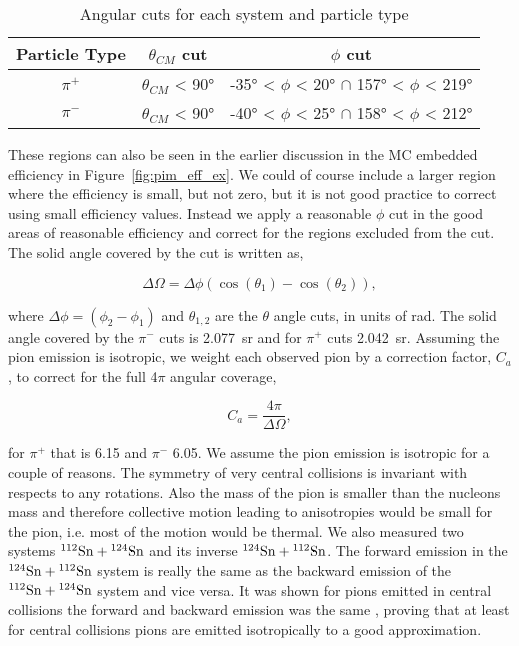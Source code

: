  \begin{table*}[!htb]
 \centering
{}
\begin{tabular}{@{}ccc@{}}\toprule 
Particle Type & $\theta_{CM}$ cut & $\phi$ cut  \\ [0.5ex] 
 \midrule
$\pi^+$  & $\theta_{CM}$ < \ang{90}   &  \ang{-35} < $\phi$ < \ang{20} $\cap$ \ang{157} < $\phi$ < \ang{219}  \\
$\pi^-$  & $\theta_{CM}$ < \ang{90}   &  \ang{-40} < $\phi$ < \ang{25} $\cap$ \ang{158} < $\phi$ < \ang{212}   \\
 \bottomrule
\end{tabular}
\caption{Angular cuts for each system and particle type}
\label{tb:anglecuts}
\end{table*}



These regions can also be seen in the earlier discussion in the MC embedded efficiency in Figure~\ref{fig:pim_eff_ex}.  We could of course include a larger region where the efficiency is small, but not zero, but it is not good practice to  correct using small efficiency values. Instead we apply a reasonable $\phi$ cut in the good areas of reasonable efficiency and correct for the regions excluded from the cut. The solid angle covered by the cut is written as,

\begin{equation}
\Delta\Omega = \Delta\phi(\cos(\theta_1) - \cos(\theta_2)),
\end{equation}

where $\Delta\phi = (\phi_2 - \phi_1)$  and $\theta_{1,2}$ are the $\theta$ angle cuts, in units of \si{\radian}. The solid angle covered by the $\pi^-$ cuts is \SI{2.077}{\steradian} and for $\pi^+$ cuts \SI{2.042}{\steradian}. Assuming the pion emission is isotropic, we weight each observed pion by a correction factor, $C_a$, to correct for the full 4$\pi$ angular coverage, 

\begin{equation}
C_a = \frac{4\pi}{\Delta\Omega},
\label{eq:acceptCorrFactor}
\end{equation}

for $\pi^+$ that is \num{6.15} and $\pi^-$ \num{6.05}. We assume the pion emission is isotropic for a couple of reasons. The symmetry of very central collisions is invariant with respects to any rotations. Also the mass of the pion is smaller than the nucleons mass and therefore collective motion leading to anisotropies would be small for the pion, i.e. most of the motion would be thermal. We also measured two systems ${}^{112}\mathrm{Sn} + {}^{124}\mathrm{Sn}$ and its inverse ${}^{124}\mathrm{Sn} + {}^{112}\mathrm{Sn}$. The forward emission in the ${}^{124}\mathrm{Sn} + {}^{112}\mathrm{Sn}$ system is really the same as the backward emission of the ${}^{112}\mathrm{Sn} + {}^{124}\mathrm{Sn}$ system and vice versa. It was shown for pions emitted in central collisions the forward and backward emission was the same \cite{jon}, proving that at least for central collisions pions are emitted isotropically to a good approximation. 


